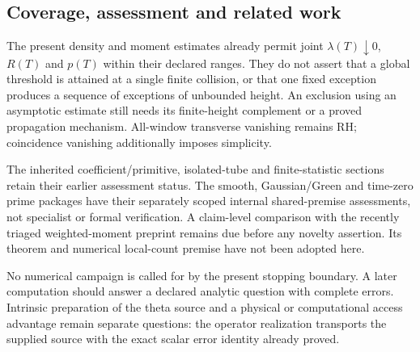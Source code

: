 \subsection{Coverage, assessment and related work}
The present density and moment estimates already permit joint
\(\lambda(T)\downarrow0\), \(R(T)\) and \(p(T)\) within their declared
ranges. They do not assert that a global threshold is attained at a
single finite collision, or that one fixed exception produces a sequence
of exceptions of unbounded height. An exclusion using an asymptotic
estimate still needs its finite-height complement or a proved propagation
mechanism. All-window transverse vanishing remains RH; coincidence
vanishing additionally imposes simplicity.

The inherited coefficient/primitive, isolated-tube and finite-statistic
sections retain their earlier assessment status. The smooth, Gaussian/Green and time-zero prime packages have their
separately scoped internal shared-premise assessments, not specialist or
formal verification.
A claim-level comparison with the recently triaged weighted-moment
preprint remains due before any novelty assertion. Its theorem and
numerical local-count premise have not been adopted here.

No numerical campaign is called for by the present stopping boundary.
A later computation should answer a declared analytic question with
complete errors. Intrinsic preparation of the theta source and a physical
or computational access advantage remain separate questions: the operator
realization transports the supplied source with the exact scalar error
identity already proved.
